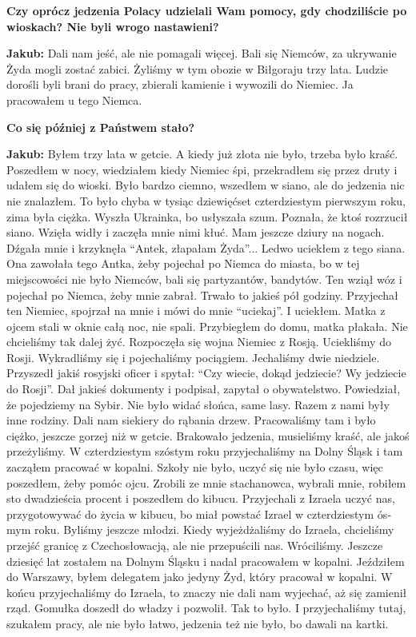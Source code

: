 \begin{otherlanguage}{ngerman}
\textbf{Czy oprócz jedzenia Polacy udzielali Wam pomocy, gdy chodziliście po wioskach? Nie byli wrogo nastawieni?} 

\textbf{Jakub:} Dali nam jeść, ale nie pomagali więcej. Bali się Niemców, za ukrywanie Żyda mogli zostać zabici. Żyliśmy w tym obozie w Biłgoraju trzy lata. Ludzie dorośli byli brani do pracy, zbierali kamienie i wywozili do Niemiec. Ja pracowałem u tego Niemca.

\textbf{Co się później z Państwem stało?} 

\textbf{Jakub:} Byłem trzy lata w getcie. A kiedy już złota nie było, trzeba było kraść. Poszedłem w nocy, wiedziałem kiedy Niemiec śpi, przekradłem się przez druty i udałem się do wioski. Było bardzo ciemno, wszedłem w siano, ale do jedzenia nic nie znalazłem. To było chyba w tysiąc dziewięćset czterdziestym pierwszym roku, zima była ciężka. Wyszła Ukrainka, bo usłyszała szum. Poznała, że ktoś rozrzucił siano. Wzięła widły i zaczęła mnie nimi kłuć. Mam jeszcze dziury na nogach. Dźgała mnie i krzyknęła "`Antek, złapałam Żyda"'... Ledwo uciekłem z tego siana. Ona zawołała tego Antka, żeby pojechał po Niemca do miasta, bo w tej miejscowości nie było Niemców, bali się partyzantów, bandytów. Ten wziął wóz i pojechał po Niemca, żeby mnie zabrał. Trwało to jakieś pół godziny. Przyjechał ten Niemiec, spojrzał na mnie i mówi do mnie "`uciekaj"'. I uciekłem. Matka z ojcem stali w oknie całą noc, nie spali. Przybiegłem do domu, matka płakała. Nie chcieliśmy tak dalej żyć. Rozpoczęła się wojna Niemiec z Rosją. Uciekliśmy do Rosji. Wykradliśmy się i pojechaliśmy pociągiem. Jechaliśmy dwie niedziele. Przyszedł jakiś rosyjski oficer i spytał: "`Czy wiecie, dokąd jedziecie? Wy jedziecie do Rosji"'. Dał jakieś dokumenty i podpisał, zapytał o obywatelstwo. Powiedział, że pojedziemy na Sybir. Nie było widać słońca, same lasy. Razem z nami były inne rodziny. Dali nam siekiery do rąbania drzew. Pracowaliśmy tam i było ciężko, jeszcze gorzej niż w getcie. Brakowało jedzenia, musieliśmy kraść, ale jakoś przeżyliśmy. W czterdziestym szóstym roku przyjechaliśmy na Dolny Śląsk i tam zacząłem pracować w kopalni. Szkoły nie było, uczyć się nie było czasu, więc poszedłem, żeby pomóc ojcu. Zrobili ze mnie stachanowca, wybrali mnie, robiłem sto dwadzieścia procent i poszedłem do kibucu. Przyjechali z Izraela uczyć nas, przygotowywać do życia w kibucu, bo miał powstać Izrael w czterdziestym ósmym roku. Byliśmy jeszcze młodzi. Kiedy wyjeżdżaliśmy do Izraela, chcieliśmy przejść granicę z Czechosłowacją, ale nie przepuścili nas. Wróciliśmy. Jeszcze dziesięć lat zostałem na Dolnym Śląsku i nadal pracowałem w kopalni. Jeździłem do Warszawy, byłem delegatem jako jedyny Żyd, który pracował w kopalni. W końcu przyjechaliśmy do Izraela, to znaczy nie dali nam wyjechać, aż się zamienił rząd. Gomułka doszedł do władzy i pozwolił. Tak to było. I przyjechaliśmy tutaj, szukałem pracy, ale nie było łatwo, jedzenia też nie było, bo dawali na kartki.


\end{otherlanguage}
